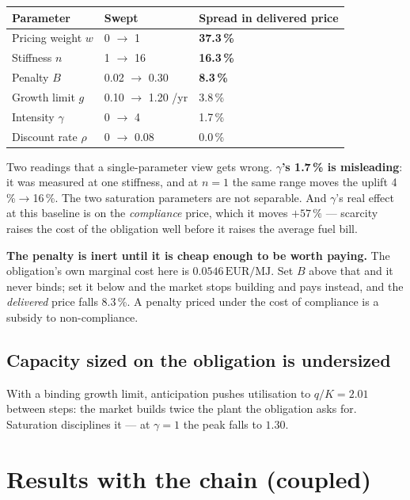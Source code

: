 \documentclass[11pt,a4paper]{article}
\newcommand{\EURMJ}{\ensuremath{\mathrm{EUR}/\mathrm{MJ}}}
\begin{document}
\begin{table}[h]
\centering\small
\begin{tabular}{@{}lll@{}}
\toprule
\textbf{Parameter} & \textbf{Swept} & \textbf{Spread in delivered price} \\
\midrule
Pricing weight $w$ & 0 $\to$ 1 & \textbf{37.3\,\%} \\
Stiffness $n$ & 1 $\to$ 16 & \textbf{16.3\,\%} \\
Penalty $B$ & 0.02 $\to$ 0.30 & \textbf{8.3\,\%} \\
Growth limit $g$ & 0.10 $\to$ 1.20 /yr & 3.8\,\% \\
Intensity $\gamma$ & 0 $\to$ 4 & 1.7\,\% \\
Discount rate $\rho$ & 0 $\to$ 0.08 & 0.0\,\% \\
\bottomrule
\end{tabular}
\end{table}

\noindent Two readings that a single-parameter view gets wrong. \textbf{$\gamma$'s
1.7\,\% is misleading}: it was measured at one stiffness, and at $n=1$ the same range
moves the uplift 4\,\%$\to$16\,\%. The two saturation parameters are not separable. And
$\gamma$'s real effect at this baseline is on the \emph{compliance} price, which it moves
$+57\,\%$ --- scarcity raises the cost of the obligation well before it raises the average
fuel bill.

\textbf{The penalty is inert until it is cheap enough to be worth paying.} The
obligation's own marginal cost here is $0.0546$\,\EURMJ. Set $B$ above that and it never
binds; set it below and the market stops building and pays instead, and the
\emph{delivered} price falls 8.3\,\%. A penalty priced under the cost of compliance is a
subsidy to non-compliance.

\subsection{Capacity sized on the obligation is undersized}
With a binding growth limit, anticipation pushes utilisation to $q/K = 2.01$ between
steps: the market builds twice the plant the obligation asks for. Saturation disciplines
it --- at $\gamma=1$ the peak falls to $1.30$.

\section{Results with the chain (coupled)}
\label{sec:coupledresults}
\end{document}
